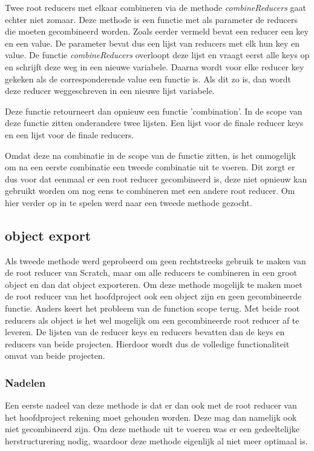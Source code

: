 Twee root reducers met elkaar combineren via de methode \textit{combineReducers} gaat echter niet zomaar. Deze methode is een functie met als parameter de reducers die moeten gecombineerd worden. Zoals eerder vermeld bevat een reducer een key en een value. De parameter bevat dus een lijst van reducers met elk hun key en value. De functie \textit{combineReducers} overloopt deze lijst en vraagt eerst alle keys op en schrijft deze weg in een nieuwe variabele. Daarna wordt voor elke reducer key gekeken als de corresponderende value een functie is. Als dit zo is, dan wordt deze reducer weggeschreven in een nieuwe lijst variabele.   

Deze functie retourneert dan opnieuw een functie 'combination'. In de scope van deze functie zitten onderandere twee lijsten. Een lijst voor de finale reducer keys en een lijst voor de finale reducers. 
 
Omdat deze na combinatie in de scope van de functie zitten, is het onmogelijk om na een eerste combinatie een tweede combinatie uit te voeren. Dit zorgt er dus voor dat eenmaal er een root reducer gecombineerd is, deze niet opnieuw kan gebruikt worden om nog eens te combineren met een andere root reducer. Om hier verder op in te spelen werd naar een tweede methode gezocht. 

\subsection{object export}
Als tweede methode werd geprobeerd om geen rechtstreeks gebruik te maken van de root reducer van Scratch, maar om alle reducers te combineren in een groot object en dan dat object exporteren. Om deze methode mogelijk te maken moet de root reducer van het hoofdproject ook een object zijn en geen gecombineerde functie. Anders keert het probleem van de function scope terug. Met beide root reducers als object is het wel mogelijk om een gecombineerde root reducer af te leveren. De lijsten van de reducer keys en reducers bevatten dan de keys en reducers van beide projecten. Hierdoor wordt dus de volledige functionaliteit omvat van beide projecten.

\subsubsection{Nadelen}
Een eerste nadeel van deze methode is dat er dan ook met de root reducer van het hoofdproject rekening moet gehouden worden. Deze mag dan namelijk ook niet gecombineerd zijn. Om deze methode uit te voeren was er een gedeeltelijke herstructurering nodig, waardoor deze methode eigenlijk al niet meer optimaal is. 


